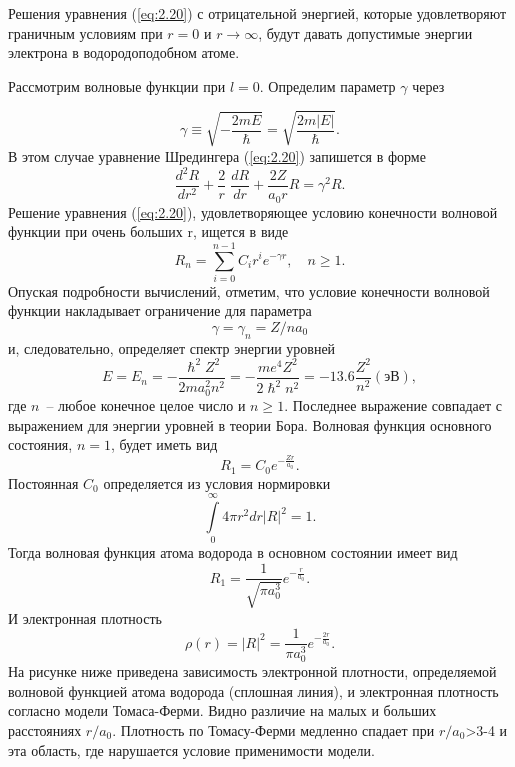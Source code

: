 \documentclass[a4paper,14pt, openany, twoside, draft]{extbook} %
\begin{document}
Решения уравнения (\ref{eq:2.20}) с отрицательной энергией, которые удовлетворяют граничным условиям при $r=0$ и $r \rightarrow \infty$, будут давать допустимые энергии электрона в водородоподобном атоме.

Рассмотрим волновые функции при $l=0$.
Определим параметр $\gamma$ через

\begin{equation*}
 \label{eq:gamma}
\gamma\equiv\sqrt{-\frac{2mE}{\hslash}}=\sqrt{\frac{2m|E|}{\hslash}}.
\end{equation*}
В этом случае уравнение Шредингера (\ref{eq:2.20}) запишется в форме
\begin{equation}
\label{eq:shred4}
\frac{d^2R}{dr^2}+\frac{2}{r}\;\frac{dR}{dr}+\frac{2Z}{a_0r}R=\gamma^2R.
\end{equation}
Решение уравнения (\ref{eq:2.20}), удовлетворяющее условию конечности волновой функции при очень больших r, ищется в виде
\begin{equation}
\label{eq:shred5}
R_n=\overset{n-1}{\underset{i=0}{\sum }}C_ir^ie^{-\gamma r},\quad n\geq 1.
\end{equation}
Опуская подробности вычислений, отметим, что условие конечности волновой функции накладывает ограничение для параметра
\begin{equation}
\gamma=\gamma_n=Z/na_0
\end{equation}
и, следовательно, определяет спектр энергии уровней
\begin{equation}
\label{eq:2.21}
E=E_n=-\frac{\hslash^2Z^2}{2ma_0^2n^2}=-\frac{me^4Z^2}{2\hslash^2n^2}=-13.6\frac{Z^2}{n^2}(\textbf{эВ}),
\end{equation}
где $n$~-- любое конечное целое число и $n\geq1$.
Последнее выражение совпадает с выражением для энергии уровней в теории Бора.
Волновая функция основного состояния, $n=1$, будет иметь вид
\begin{equation}
\label{eq:wavefunction}
R_1=C_0e^{-\frac{Zr}{a_0}}.
\end{equation}
Постоянная $C_0$ определяется из условия нормировки
\begin{equation}
\label{eq:wavefunction}
\overset{\infty}{\underset{0}{\int}}4\mathit{\pi r}^2dr|R|^2=1.
\end{equation}
Тогда волновая функция атома водорода в основном состоянии имеет вид
\begin{equation}
\label{eq:2.22}
R_1=\frac {1}{\sqrt{\mathit{\pi a_0^3}}}e^{-\frac{r}{a_0}}.
\end{equation}
И электронная плотность
\begin{equation}
\label{eq:2.23}
\rho (r)=|R|^2=\frac{1}{\mathit{\pi a_0^3}}e^{-\frac{2r}{a_0}}.
\end{equation}
На рисунке ниже приведена зависимость электронной плотности, определяемой волновой функцией атома водорода (сплошная линия), и электронная плотность согласно модели Томаса-Ферми.  Видно различие на малых и больших расстояниях  $r/a_0$. Плотность по Томасу-Ферми медленно спадает при $r/a_0${\textgreater}3-4 и эта область, где нарушается условие применимости модели.
\end{document}
